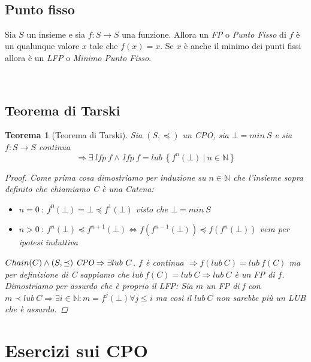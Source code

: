 \documentclass[a4paper, 10pt]{article} %
\begin{document}
\
\subsection{Punto fisso}
\begin{definizione}
  Sia $S$ un insieme e sia $f : S \rightarrow S$ una funzione. Allora un \emph{FP} o \emph{Punto Fisso} di $f$ è un qualunque valore $x$ tale che $f(x) = x$.
  Se $x$ è anche il minimo dei punti fissi allora è un \emph{LFP} o \emph{Minimo Punto Fisso}.
\end{definizione}

\newtheorem{teorema}{Teorema}
\
\subsection{Teorema di Tarski}
\begin{teorema}[Teorema di Tarski]
  Sia $(S, \preceq)$ un \emph{CPO}, sia $\bot = min\ S$ e sia $f : S \rightarrow S$ continua
  $$\Rightarrow \exists\ lfp\ f \land\ lfp\ f = lub\ \left\{f^n(\bot)\ |\ n \in \mathbb{N}\right\}$$
  \begin{proof}
    Come prima cosa dimostriamo per induzione su $n \in \mathbb{N}$ che l'insieme sopra definito che chiamiamo C è una \emph{Catena}:
    \begin{itemize}
      \item[$\circ$] $n = 0\ :\ f^0(\bot) = \bot \preceq f^1(\bot)$ visto che $\bot = min\ S$
      \item[$\circ$] $n > 0\ :\ f^n(\bot) \preceq f^{n+1}(\bot) \Longleftrightarrow f(f^{n-1}(\bot)) \preceq f(f^n(\bot))$ vera per ipotesi induttiva
    \end{itemize}
    $Chain(C) \land (S, \preceq)\ \emph{CPO} \Rightarrow \exists lub\ C$. $f$ è continua $\Rightarrow f(lub\ C) = lub\ f(C)$ ma per definizione di C sappiamo
    che $lub\ f(C) = lub\ C \Rightarrow lub\ C$ è un \emph{FP} di $f$. Dimostriamo per assurdo che è proprio il \emph{LFP}:
    Sia $m$ un \emph{FP} di f con $m \prec lub\ C \Rightarrow \exists i \in \mathbb{N} : m = f^j(\bot) \forall j \leq i$ ma così il $lub\ C$ non sarebbe più
    un \emph{LUB} che è assurdo.
  \end{proof}
\end{teorema}

\newpage
\section{Esercizi sui CPO}

\theoremstyle{definition}
\newtheorem{esercizio}{Esercizio}
\end{document}

